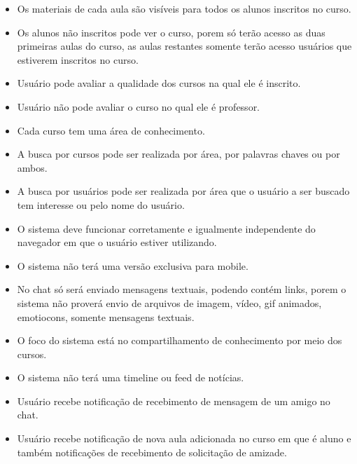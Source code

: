 \documentclass[12pt,a4paper,onecolumn,titlepage]{article}
\begin{document}
\begin{itemize}
\item Os materiais de cada aula são visíveis para todos os alunos inscritos no curso.
\item Os alunos não inscritos pode ver o curso, porem só terão acesso as duas primeiras aulas do curso, as aulas restantes somente terão acesso usuários que estiverem inscritos no curso.
\item Usuário pode avaliar a qualidade dos cursos na qual ele é inscrito.
\item Usuário não pode avaliar o curso no qual ele é professor.
\item Cada curso tem uma área de conhecimento.
\item A busca por cursos pode ser realizada por área, por palavras chaves ou por ambos.
\item A busca por usuários pode ser realizada por área que o usuário a ser buscado tem interesse ou pelo nome do usuário.
\item O sistema deve funcionar corretamente e igualmente independente do navegador em que o usuário estiver utilizando.
\item O sistema não terá uma versão exclusiva para mobile.
\item No chat só será enviado mensagens textuais, podendo contém links, porem o sistema não proverá envio de arquivos de imagem, vídeo, gif animados, emotiocons, somente mensagens textuais.
\item O foco do sistema está no compartilhamento de conhecimento por meio dos cursos.
\item O sistema não terá uma timeline ou feed de notícias.
\item Usuário recebe notificação de recebimento de mensagem de um amigo no chat.
\item Usuário recebe notificação de nova aula adicionada no curso em que é aluno e também notificações de recebimento de solicitação de amizade.
\end{itemize}




%
%
\end{document}
